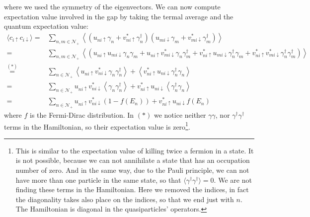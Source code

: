 \documentclass[../main.tex]{subfile}
\begin{document}
where we used the symmetry of the eigenvectors. We can now compute expectation value involved in the gap by taking the termal average and the quantum expectation value:
\begin{equation}\label{eq:transfo_c_up_c_down_BdG}
\begin{aligned}
    \langle c_{i\uparrow}c_{i\downarrow} \rangle =& \sum_{n,m\in\mathcal{N}_+} \left\langle\left(u_{ni\uparrow}\gamma_n + v_{ni\uparrow}^{\ast}\gamma_{n}^{\dagger}\right)\left(u_{mi\downarrow}\gamma_m + v_{mi\downarrow}^{\ast}\gamma_{m}^{\dagger}\right)\right\rangle\\
     =&  \sum_{n,m\in\mathcal{N}_+} \left\langle\left(u_{ni\uparrow} u_{mi\downarrow}\gamma_n\gamma_m + u_{ni\uparrow} v_{mi\downarrow}^{\ast}\gamma_n\gamma_{m}^{\dagger} + v_{ni\uparrow}^{\ast}u_{mi\downarrow}\gamma_{n}^{\dagger} \gamma_m+  v_{ni\uparrow}^{\ast} v_{mi\downarrow}^{\ast}\gamma_{n}^{\dagger}\gamma_{m}^{\dagger}  \right)\right\rangle\\
     \stackrel{(\ast)}{=}&  \sum_{n\in\mathcal{N}_+} \left\langle u_{ni\uparrow} v_{ni\downarrow}^{\ast}\gamma_n\gamma_{n}^{\dagger}\right\rangle + \left\langle v_{ni\uparrow}^{\ast}u_{ni\downarrow}\gamma_{n}^{\dagger}\gamma_{n}\right\rangle\\     
     =&  \sum_{n\in\mathcal{N}_+} u_{ni\uparrow} v_{ni\downarrow}^{\ast}\left\langle\gamma_n\gamma_{n}^{\dagger}\right\rangle + v_{ni\uparrow}^{\ast}u_{ni\downarrow}\left\langle \gamma_{n}^{\dagger}\gamma_{n}\right\rangle\\
     =&  \sum_{n\in\mathcal{N}_+} u_{ni\uparrow} v_{ni\downarrow}^{\ast} \left(1-f(E_n)\right) + v_{ni\uparrow}^{\ast}u_{ni\downarrow}f(E_n)
\end{aligned}
\end{equation}
where $f$ is the Fermi-Dirac distribution. In $(\ast)$ we notice neither $\gamma\gamma$, nor $\gamma^{\dagger}\gamma^{\dagger}$ terms in the Hamiltonian, so their expectation 
value is zero\footnote{This is similar to the expectation value of killing twice a fermion in a state. It is not possible, because we can not annihilate a state that has an occupation number of zero.
And in the same way, due to the Pauli principle, we can not have more than one particle in the same state, so that $\langle \gamma^{\dagger} \gamma^{\dagger} \rangle = 0$. We are not 
finding these terms in the Hamiltonian. Here we removed the indices, in fact the diagonality takes also place on the indices, so that we end just with $n$.
The Hamiltonian is diagonal in the quasiparticles' operators.}.
\end{document}
